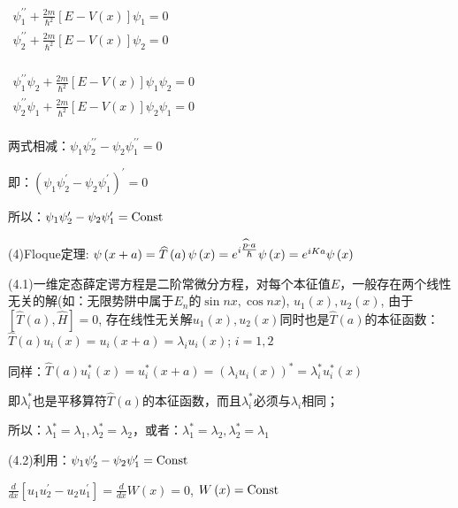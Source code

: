 $\begin{array}{l}
 \psi _1 ^{\prime \prime }  + \frac{{2m}}{{\hbar ^2 }}\left[ {E - V\left( x \right)} \right]\psi _1  = 0 \\
 \psi _2 ^{\prime \prime }  + \frac{{2m}}{{\hbar ^2 }}\left[ {E - V\left( x \right)} \right]\psi _2  = 0 \\
 \end{array}$


$\begin{array}{l}
 \psi _1 ^{\prime \prime } \psi _2  + \frac{{2m}}{{\hbar ^2 }}\left[ {E - V\left( x \right)} \right]\psi _1 \psi _2  = 0 \\
 \psi _2 ^{\prime \prime } \psi _1  + \frac{{2m}}{{\hbar ^2 }}\left[ {E - V\left( x \right)} \right]\psi _2 \psi _1  = 0 \\
 \end{array}$

两式相减：$\psi _1 \psi _2 ^{\prime \prime }  - \psi _2 \psi _1 ^{\prime \prime }  = 0$

即：$\left( {\psi _1 \psi _2 ^\prime   - \psi _2 \psi _1 ^\prime  } \right)^\prime   = 0$

所以：$\psi _1 \psi _2 ^\prime   - \psi _2 \psi _1 ^\prime   = {\rm{Const}}$

(4)Floque定理: $\psi \left( {x + a} \right) = \widehat T\left( a
\right)\psi \left( x \right) = e^{i{\textstyle{{\widehat p \cdot a}
\over \hbar }}} \psi \left( x \right) = e^{iKa} \psi \left( x
\right)$

(4.1)一维定态薛定谔方程是二阶常微分方程，对每个本征值$E$，一般存在两个线性无关的解(如：无限势阱中属于$E_n$的$\sin nx,\cos nx$), $u_1 (x),u_2 (x)$, 由于$\left[ {\widehat T(a),\widehat H} \right] = 0$, 存在线性无关解$u_1 (x),u_2 (x)$同时也是$\widehat T\left( a \right)$的本征函数：$\widehat T(a)u_i (x) = u_i (x + a) = \lambda _i u_i (x)$; $i = 1,2$

同样：$\widehat T(a)u_i^* (x) = u_i^* (x + a) = \left( {\lambda _i u_i (x)} \right)^*  = \lambda _i^* u_i^* (x)$

即$\lambda _i ^* $也是平移算符$\widehat T(a)$的本征函数，而且$\lambda _i ^* $必须与$\lambda _i$相同；

所以：$\lambda _1 ^*  = \lambda _1 ,\lambda _2 ^*  = \lambda _2 $，或者：$\lambda _1 ^*  = \lambda _2 ,\lambda _2 ^*  = \lambda _1 $

(4.2)利用：$\psi _1 \psi _2 ^\prime   - \psi _2 \psi _1 ^\prime   = {\rm{Const}}$

$\frac{d}{{dx}}\left[ {u_1 u_2 ^\prime   - u_2 u_1 ^\prime  } \right] = \frac{d}{{dx}}W\left( x \right) = 0$, $W\left( x \right) = {\rm{Const}}$

